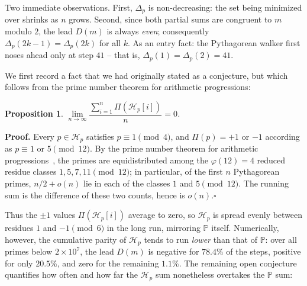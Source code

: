 \documentclass{article}
\theoremstyle{plain}
\newtheorem{proposition}{Proposition}
\theoremstyle{definition}
\theoremstyle{remark}
\begin{document}
Two immediate observations. First, $\Delta_p$ is non-decreasing: the set
being minimized over shrinks as $n$ grows. Second, since both partial sums
are congruent to $m$ modulo $2$, the lead $D(m)$ is always {\em even\/};
consequently $\Delta_p(2k-1) = \Delta_p(2k)$ for all $k$. As an entry
fact: the Pythagorean walker first noses ahead only at step $41$ --
that is, $\Delta_p(1) = \Delta_p(2) = 41$.

We first record a fact that we had originally stated as a conjecture, but
which follows from the prime number theorem for arithmetic progressions:

\begin{proposition}\label{prop:mean-zero}
$\lim\limits_{n \rightarrow \infty} \dfrac{\sum\limits_{i=1}^n \Pi(\mathcal{H}_p[i])}{n} = 0$.
\end{proposition}

\textbf{Proof.} Every $p \in \mathcal{H}_p$ satisfies $p \equiv 1 \pmod 4$, and
$\Pi(p) = +1$ or $-1$ according as $p \equiv 1$ or $5 \pmod{12}$. By the prime
number theorem for arithmetic progressions~\cite{davenport}, the primes are
equidistributed among the $\varphi(12) = 4$ reduced residue classes
$1, 5, 7, 11 \pmod{12}$; in particular, of the first $n$ Pythagorean primes,
$n/2 + o(n)$ lie in each of the classes $1$ and $5 \pmod{12}$. The running sum
is the difference of these two counts, hence is $o(n)$.\hfill$\square$

Thus the $\pm 1$ values $\Pi(\mathcal{H}_p[i])$ average to zero, so
$\mathcal{H}_p$ is spread evenly between residues $1$ and $-1 \pmod 6$ in the
long run, mirroring $\mathbb{P}$ itself. Numerically, however, the cumulative
parity of $\mathcal{H}_p$ tends to run {\em lower\/} than that of $\mathbb{P}$:
over all primes below $2 \times 10^7$, the lead $D(m)$ is negative for
$78.4\%$ of the steps, positive for only $20.5\%$, and zero for the
remaining $1.1\%$.
The remaining open conjecture quantifies how often and how far the
$\mathcal{H}_p$ sum nonetheless overtakes the $\mathbb{P}$ sum:
\end{document}
